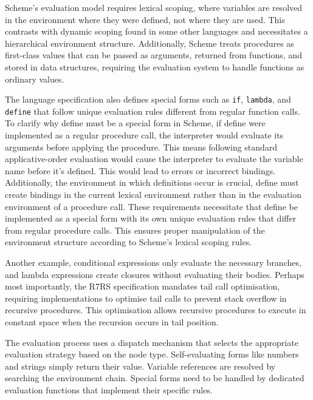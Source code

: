 \documentclass[final]{cmpreport_02}
\begin{document}
Scheme's evaluation model requires lexical scoping, where variables are resolved in the environment where they were defined, not where they are used. This contrasts with dynamic scoping found in some other languages and necessitates a hierarchical environment structure. Additionally, Scheme treats procedures as first-class values that can be passed as arguments, returned from functions, and stored in data structures, requiring the evaluation system to handle functions as ordinary values.\newline

The language specification also defines special forms such as \texttt{if}, \texttt{lambda}, and \texttt{define} that follow unique evaluation rules different from regular function calls. To clarify why define must be a special form in Scheme, if define were implemented as a regular procedure call, the interpreter would evaluate its arguments before applying the procedure. This means following standard applicative-order evaluation would cause the interpreter to evaluate the variable name before it's defined. This would lead to errors or incorrect bindings. Additionally, the environment in which definitions occur is crucial, define must create bindings in the current lexical environment rather than in the evaluation environment of a procedure call. These requirements necessitate that define be implemented as a special form with its own unique evaluation rules that differ from regular procedure calls. This ensures proper manipulation of the environment structure according to Scheme's lexical scoping rules.\newline

Another example, conditional expressions only evaluate the necessary branches, and lambda expressions create closures without evaluating their bodies. Perhaps most importantly, the R7RS specification mandates tail call optimisation, requiring implementations to optimise tail calls to prevent stack overflow in recursive procedures. This optimisation allows recursive procedures to execute in constant space when the recursion occurs in tail position.\newline

The evaluation process uses a dispatch mechanism that selects the appropriate evaluation strategy based on the node type. Self-evaluating forms like numbers and strings simply return their value. Variable references are resolved by searching the environment chain. Special forms need to be handled by dedicated evaluation functions that implement their specific rules.\newline
\end{document}
